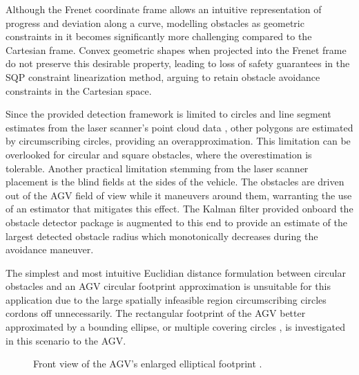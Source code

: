 Although the Frenet coordinate frame allows an intuitive representation of progress and deviation along a curve, modelling obstacles as geometric constraints in it becomes significantly more challenging compared to the Cartesian frame. Convex geometric shapes when projected into the Frenet frame do not preserve this desirable property, leading to loss of safety guarantees in the \ac{SQP} constraint linearization method, arguing to retain obstacle avoidance constraints in the Cartesian space.
\par Since the provided detection framework is limited to circles and line segment estimates from the laser scanner's point cloud data \cite{habermann_obstacle_2010}, other polygons are estimated by circumscribing circles, providing an overapproximation. This limitation can be overlooked for circular and square obstacles, where the overestimation is tolerable. Another practical limitation stemming from the laser scanner placement is the blind fields at the sides of the vehicle. The obstacles are driven out of the \ac{AGV} field of view while it maneuvers around them, warranting the use of an estimator that mitigates this effect.
The Kalman filter provided onboard the obstacle detector package is augmented to this end to provide an estimate of the largest detected obstacle radius which monotonically decreases during the avoidance maneuver. 
\par The simplest and most intuitive Euclidian distance formulation between circular obstacles and an \ac{AGV} circular footprint approximation is unsuitable for this application due to the large spatially infeasible region circumscribing circles cordons off unnecessarily.
The rectangular footprint of the \ac{AGV} better approximated by a bounding ellipse, or multiple covering circles \cite{reiter_frenet-cartesian_2023}, is investigated in this scenario to the \ac{AGV}.


\begin{figure}[htbp]
    \begin{center}
        \def\svgwidth{0.7\textwidth}
        
        \caption{Front view of the AGV's enlarged elliptical footprint \cite{malitzky_markus_mechanical_nodate}.}
        \label{fig_el}
    \end{center}
\end{figure}

